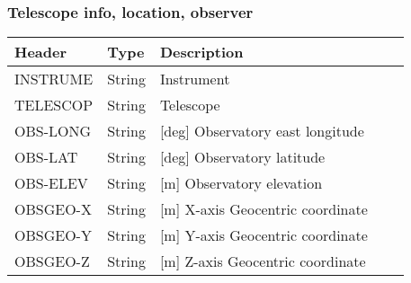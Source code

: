 \subsubsection{Telescope info, location, observer}
\begin{tabular}{l l l l l}

\hline
Header & Type & Description \\
\hline
INSTRUME & String & Instrument \\
TELESCOP & String & Telescope \\
OBS-LONG & String & [deg] Observatory east longitude \\
OBS-LAT & String & [deg] Observatory latitude \\
OBS-ELEV & String & [m] Observatory elevation \\
OBSGEO-X & String & [m] X-axis Geocentric coordinate \\
OBSGEO-Y & String & [m] Y-axis Geocentric coordinate \\
OBSGEO-Z & String & [m] Z-axis Geocentric coordinate \\
\hline
\end{tabular}


